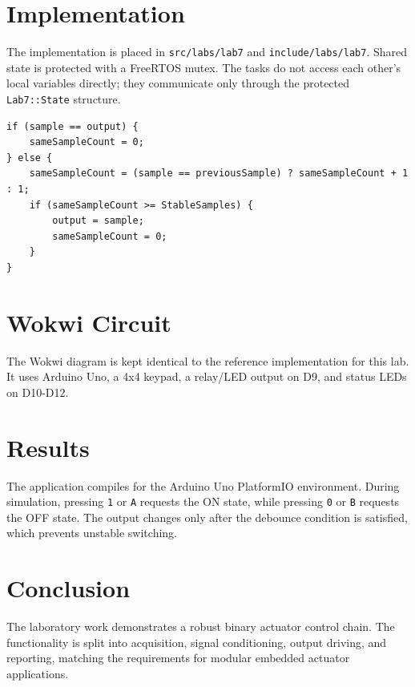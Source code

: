 \documentclass[12pt]{article}
\begin{document}
\section{Implementation}
The implementation is placed in \texttt{src/labs/lab7} and \texttt{include/labs/lab7}. Shared state is protected with a FreeRTOS mutex. The tasks do not access each other's local variables directly; they communicate only through the protected \texttt{Lab7::State} structure.

\begin{lstlisting}
if (sample == output) {
    sameSampleCount = 0;
} else {
    sameSampleCount = (sample == previousSample) ? sameSampleCount + 1 : 1;
    if (sameSampleCount >= StableSamples) {
        output = sample;
        sameSampleCount = 0;
    }
}
\end{lstlisting}

\section{Wokwi Circuit}
The Wokwi diagram is kept identical to the reference implementation for this lab. It uses Arduino Uno, a 4x4 keypad, a relay/LED output on D9, and status LEDs on D10-D12.

\section{Results}
The application compiles for the Arduino Uno PlatformIO environment. During simulation, pressing \texttt{1} or \texttt{A} requests the ON state, while pressing \texttt{0} or \texttt{B} requests the OFF state. The output changes only after the debounce condition is satisfied, which prevents unstable switching.

\section{Conclusion}
The laboratory work demonstrates a robust binary actuator control chain. The functionality is split into acquisition, signal conditioning, output driving, and reporting, matching the requirements for modular embedded actuator applications.
\end{document}
